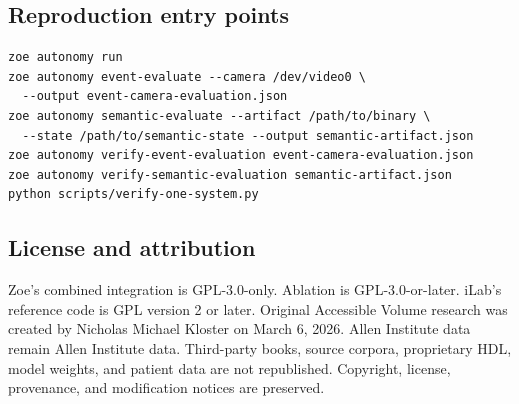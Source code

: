 \documentclass[11pt]{article}
\begin{document}
\subsection{Reproduction entry points}

\begin{lstlisting}
zoe autonomy run
zoe autonomy event-evaluate --camera /dev/video0 \
  --output event-camera-evaluation.json
zoe autonomy semantic-evaluate --artifact /path/to/binary \
  --state /path/to/semantic-state --output semantic-artifact.json
zoe autonomy verify-event-evaluation event-camera-evaluation.json
zoe autonomy verify-semantic-evaluation semantic-artifact.json
python scripts/verify-one-system.py
\end{lstlisting}

\subsection{License and attribution}

Zoe's combined integration is GPL-3.0-only. Ablation is GPL-3.0-or-later. iLab's reference code is GPL version 2 or later. Original Accessible Volume research was created by Nicholas Michael Kloster on March 6, 2026. Allen Institute data remain Allen Institute data. Third-party books, source corpora, proprietary HDL, model weights, and patient data are not republished. Copyright, license, provenance, and modification notices are preserved.
\end{document}

